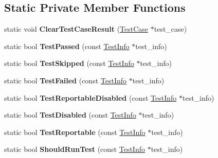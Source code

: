 \subsection*{Static Private Member Functions}
\begin{DoxyCompactItemize}
\item 
\mbox{\label{classtesting_1_1_test_case_a1c05fe33863b79b1b1ed19e665a1cea7}} 
static void {\bfseries Clear\+Test\+Case\+Result} (\mbox{\hyperlink{classtesting_1_1_test_case}{Test\+Case}} $\ast$test\+\_\+case)
\item 
\mbox{\label{classtesting_1_1_test_case_ad8d9e1ebc410000b679002ba71d78686}} 
static bool {\bfseries Test\+Passed} (const \mbox{\hyperlink{classtesting_1_1_test_info}{Test\+Info}} $\ast$test\+\_\+info)
\item 
\mbox{\label{classtesting_1_1_test_case_a79ebb32bfa7e090ac1baa012b679a2f2}} 
static bool {\bfseries Test\+Skipped} (const \mbox{\hyperlink{classtesting_1_1_test_info}{Test\+Info}} $\ast$test\+\_\+info)
\item 
\mbox{\label{classtesting_1_1_test_case_a5922884cb8b4819e869146dc315a1ac1}} 
static bool {\bfseries Test\+Failed} (const \mbox{\hyperlink{classtesting_1_1_test_info}{Test\+Info}} $\ast$test\+\_\+info)
\item 
\mbox{\label{classtesting_1_1_test_case_a1f2da5337f941d746dfcb98bc4acc149}} 
static bool {\bfseries Test\+Reportable\+Disabled} (const \mbox{\hyperlink{classtesting_1_1_test_info}{Test\+Info}} $\ast$test\+\_\+info)
\item 
\mbox{\label{classtesting_1_1_test_case_a2c6989cdeac01b2153f2e34dca1dbde6}} 
static bool {\bfseries Test\+Disabled} (const \mbox{\hyperlink{classtesting_1_1_test_info}{Test\+Info}} $\ast$test\+\_\+info)
\item 
\mbox{\label{classtesting_1_1_test_case_a2c3767df71e07939b32f19ef9c6ed271}} 
static bool {\bfseries Test\+Reportable} (const \mbox{\hyperlink{classtesting_1_1_test_info}{Test\+Info}} $\ast$test\+\_\+info)
\item 
\mbox{\label{classtesting_1_1_test_case_a75eb139557c43362f94916cfd6762c94}} 
static bool {\bfseries Should\+Run\+Test} (const \mbox{\hyperlink{classtesting_1_1_test_info}{Test\+Info}} $\ast$test\+\_\+info)
\end{DoxyCompactItemize}
